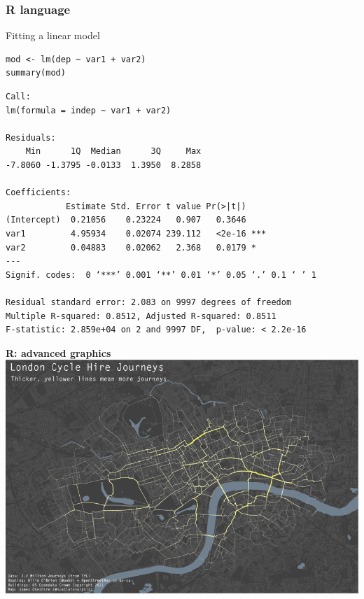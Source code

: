 \documentclass[9pt,xcolor=pdftex,dvipsnames,table]{beamer}
\begin{document}
\begin{frame}[fragile] %
\frametitle{\textbf{R language}}
Fitting a linear model
\begin{verbatim}
mod <- lm(dep ~ var1 + var2)
summary(mod)
\end{verbatim}

\scriptsize{
\begin{verbatim}
Call:
lm(formula = indep ~ var1 + var2)

Residuals:
    Min      1Q  Median      3Q     Max 
-7.8060 -1.3795 -0.0133  1.3950  8.2858 

Coefficients:
            Estimate Std. Error t value Pr(>|t|)    
(Intercept)  0.21056    0.23224   0.907   0.3646    
var1         4.95934    0.02074 239.112   <2e-16 ***
var2         0.04883    0.02062   2.368   0.0179 *  
---
Signif. codes:  0 ‘***’ 0.001 ‘**’ 0.01 ‘*’ 0.05 ‘.’ 0.1 ‘ ’ 1 

Residual standard error: 2.083 on 9997 degrees of freedom
Multiple R-squared: 0.8512,	Adjusted R-squared: 0.8511 
F-statistic: 2.859e+04 on 2 and 9997 DF,  p-value: < 2.2e-16
\end{verbatim} 
}
\end{frame}


\begin{frame}{\textbf{R: advanced graphics}}
\centering
\includegraphics[width=1\textwidth]{images/bike-routes.png}
\vspace{-1cm}
\end{frame}
\end{document}
